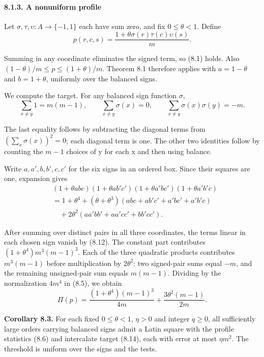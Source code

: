 \documentclass[english,11pt,a4paper]{article}
\begin{document}
\paragraph{8.1.3. A nonuniform profile}\label{a-nonuniform-profile}

Let \(\sigma,\tau,\upsilon:A\to\{-1,1\}\) each have sum zero, and fix \(0\leq\theta<1\). Define
\[p(r,c,s)=\frac{1+\theta\sigma(r)\tau(c)\upsilon(s)}m.               \tag{8.11}\]

Summing in any coordinate eliminates the signed term, so (8.1) holds. Also \((1-\theta)/m\leq p\leq(1+\theta)/m\). Theorem 8.1 therefore applies with \(a=1-\theta\) and \(b=1+\theta\), uniformly over the balanced signs.

We compute the target. For any balanced sign function \(\sigma\),
\[\sum_{x\ne y}1=m(m-1),\qquad
\sum_{x\ne y}\sigma(x)=0,\qquad
\sum_{x\ne y}\sigma(x)\sigma(y)=-m.                                \tag{8.12}\]

The last equality follows by subtracting the diagonal terms from \((\sum_x\sigma(x))^2=0\); each diagonal term is one. The other two identities follow by counting the \(m-1\) choices of y for each x and then using balance.

Write \(a,a',b,b',c,c'\) for the six signs in an ordered box. Since their squares are one, expansion gives
\[\begin{aligned}
&(1+\theta abc)(1+\theta ab'c')
 (1+\theta a'bc')(1+\theta a'b'c)\\
&=1+\theta^4
 +(\theta+\theta^3)(abc+ab'c'+a'bc'+a'b'c)\\
&\quad+2\theta^2(aa'bb'+aa'cc'+bb'cc').
\end{aligned}                                                       \tag{8.13}\]

After summing over distinct pairs in all three coordinates, the terms linear in each chosen sign vanish by (8.12). The constant part contributes \((1+\theta^4)m^3(m-1)^3\). Each of the three quadratic products contributes \(m^3(m-1)\) before multiplication by \(2\theta^2\): two signed-pair sums equal \(-m\), and the remaining unsigned-pair sum equals \(m(m-1)\). Dividing by the normalization \(4m^4\) in (8.5), we obtain
\[\Pi(p)=\frac{(1+\theta^4)(m-1)^3}{4m}
+\frac{3\theta^2(m-1)}{2m}.                                        \tag{8.14}\]

\textbf{Corollary 8.3.} For each fixed \(0\leq\theta<1\), \(\eta>0\) and integer \(q\geq0\), all sufficiently large orders carrying balanced signs admit a Latin square with the profile statistics (8.6) and intercalate target (8.14), each with error at most \(\eta m^2\). The threshold is uniform over the signs and the tests.
\end{document}
